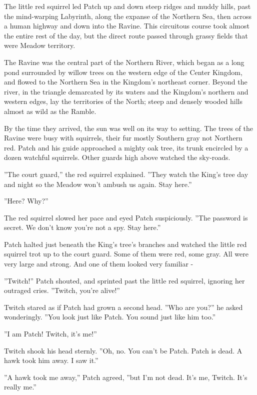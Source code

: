 \documentclass[12pt]{book}
\begin{document}
 The little red squirrel led Patch up and down steep ridges and muddy hills, past the mind-warping Labyrinth, along the expanse of the Northern Sea, then across a human highway and down into the Ravine. This circuitous course took almost the entire rest of the day, but the direct route passed through grassy fields that were Meadow territory.\par
The Ravine was the central part of the Northern River, which began as a long pond surrounded by willow trees on the western edge of the Center Kingdom, and flowed to the Northern Sea in the Kingdom's northeast corner. Beyond the river, in the triangle demarcated by its waters and the Kingdom's northern and western edges, lay the territories of the North; steep and densely wooded hills almost as wild as the Ramble.\par
By the time they arrived, the sun was well on its way to setting. The trees of the Ravine were busy with squirrels, their fur mostly Southern gray not Northern red. Patch and his guide approached a mighty oak tree, its trunk encircled by a dozen watchful squirrels. Other guards high above watched the sky-roads.\par
 ''The court guard,'' the red squirrel explained. ''They watch the King's tree day and night so the Meadow won't ambush us again. Stay here.''\par
 ''Here? Why?''\par
 The red squirrel slowed her pace and eyed Patch suspiciously. ''The password is secret. We don't know you're not a spy. Stay here.''\par
 Patch halted just beneath the King's tree's branches and watched the little red squirrel trot up to the court guard. Some of them were red, some gray. All were very large and strong. And one of them looked very familiar -\par
 ''Twitch!'' Patch shouted, and sprinted past the little red squirrel, ignoring her outraged cries. ''Twitch, you're alive!''\par
 Twitch stared as if Patch had grown a second head. ''Who are you?'' he asked wonderingly. ''You look just like Patch. You sound just like him too.''\par
 ''I am Patch! Twitch, it's me!''\par
 Twitch shook his head sternly. ''Oh, no. You can't be Patch. Patch is dead. A hawk took him away. I saw it.''\par
 ''A hawk took me away,'' Patch agreed, ''but I'm not dead. It's me, Twitch. It's really me.''\par
\end{document}

